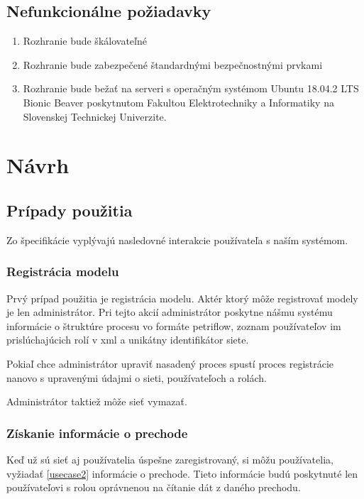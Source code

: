 \subsection{Nefunkcionálne požiadavky}  
\begin{enumerate}  
	
	\item Rozhranie bude škálovateľné  
	
	\item Rozhranie bude zabezpečené štandardnými bezpečnostnými prvkami 

	\item Rozhranie bude bežať na serveri s operačným systémom Ubuntu 18.04.2 LTS Bionic Beaver poskytnutom Fakultou Elektrotechniky a Informatiky na Slovenskej Technickej Univerzite.   
	
\end{enumerate}  



\section{Návrh}  



\subsection{Prípady použitia} 
Zo špecifikácie vyplývajú nasledovné interakcie používateľa s naším systémom. 


\subsubsection{Registrácia modelu} 
Prvý prípad použitia je registrácia modelu. Aktér ktorý môže registrovať modely je len administrátor. Pri tejto akcií administrátor poskytne nášmu systému informácie o štruktúre procesu vo formáte petriflow, zoznam používateľov im prislúchajúcich rolí v \acrshort{xml} a unikátny identifikátor siete.  

Pokiaľ chce administrátor upraviť nasadený proces spustí proces registrácie nanovo s upravenými údajmi o sieti, používateľoch a rolách. 

Administrátor taktiež môže sieť vymazať. 


\subsubsection{Získanie informácie o prechode} 
Keď už sú sieť aj používatelia úspešne zaregistrovaný, si môžu používatelia, vyžiadať \ref{usecase2} informácie o prechode. Tieto informácie budú poskytnuté len používateľovi s rolou oprávnenou na čítanie dát z daného prechodu. 

